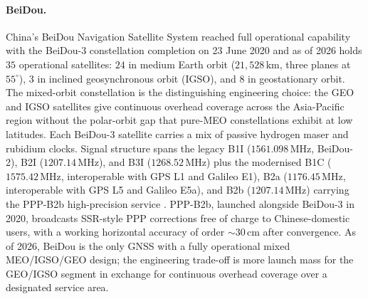 \paragraph{BeiDou.} China's BeiDou Navigation Satellite System
reached full operational capability with the BeiDou-3 constellation
completion on 23 June 2020 and as of 2026 holds $35$ operational
satellites: $24$ in medium Earth orbit ($21{,}528 \,\si{\kilo
\meter}$, three planes at $55^{\circ}$), $3$ in inclined
geosynchronous orbit (IGSO), and $8$ in geostationary orbit. The
mixed-orbit constellation is the distinguishing engineering choice:
the GEO and IGSO satellites give continuous overhead coverage
across the Asia-Pacific region without the polar-orbit gap that
pure-MEO constellations exhibit at low latitudes. Each BeiDou-3
satellite carries a mix of passive hydrogen maser and rubidium
clocks. Signal structure spans the legacy B1I
($1561.098 \,\si{\mega\hertz}$, BeiDou-2), B2I ($1207.14 \,\si{
\mega\hertz}$), and B3I ($1268.52 \,\si{\mega\hertz}$) plus the
modernised B1C ($1575.42 \,\si{\mega\hertz}$, interoperable with
GPS L1 and Galileo E1), B2a ($1176.45 \,\si{\mega\hertz}$,
interoperable with GPS L5 and Galileo E5a), and B2b
($1207.14 \,\si{\mega\hertz}$) carrying the PPP-B2b high-precision
service \cite{web:ch06t3b-csno-tarc-beidou-icd-2020}. PPP-B2b,
launched alongside BeiDou-3 in 2020, broadcasts SSR-style PPP
corrections free of charge to Chinese-domestic users, with a
working horizontal accuracy of order $\sim 30 \,\si{\centi\meter}$
after convergence. As of 2026, BeiDou is the only GNSS with a
fully operational mixed MEO/IGSO/GEO design; the engineering
trade-off is more launch mass for the GEO/IGSO segment in exchange
for continuous overhead coverage over a designated service area.

